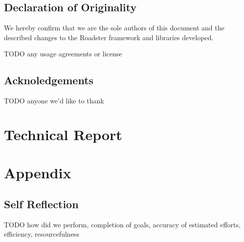 \documentclass[a4paper]{report}
\begin{document}
\chapter*{Declaration of Originality}
We hereby confirm that we are the sole authors of this document and the
described changes to the Roadster framework and libraries developed.

TODO any usage agreements or license
%

\chapter*{Acknoledgements}
TODO anyone we'd like to thank




\tableofcontents
\listoffigures
\listoftables
\lstlistoflistings

\pagebreak
{}
\setcounter{page}{1}
\part{Technical Report}







\printbibliography

\appendix
\part{Appendix}
\chapter{Self Reflection}
TODO how did we perform, completion of goals, accuracy of estimated efforts, efficiency, resourcefulness
\end{document}
